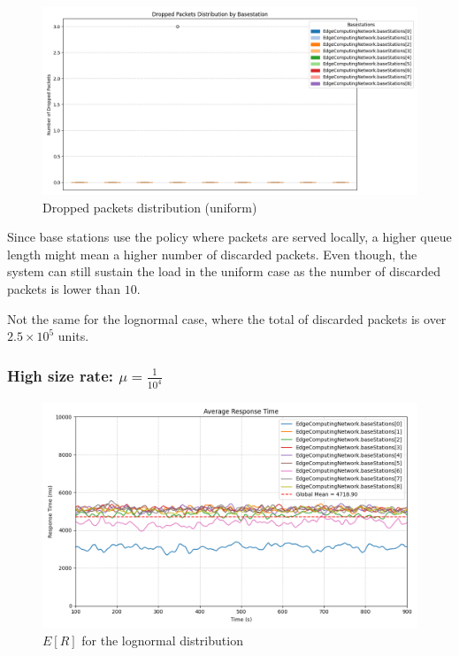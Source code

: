 \documentclass{report}
\begin{document}
\begin{figure}[H]
    \centering
    \includegraphics[width=\textwidth]{img/plots/uni_1e3_A/dropped.png}
    \caption{Dropped packets distribution (uniform)}
\end{figure}

\begin{flushleft}
Since base stations use the policy where packets are served locally, a higher queue length might mean a higher number of discarded packets. Even though, the system can still sustain the load in the uniform case as the number of discarded packets is lower than $10$.

\vspace{1em} 

Not the same for the lognormal case, where the total of discarded packets is over $2.5\times10^5$ units.
\end{flushleft}

\vspace{10mm}

\subsubsection*{High size rate: $\mu=\frac{1}{10^4}$}

\begin{figure}[H]
    \centering
    \includegraphics[width=\textwidth]{img/plots/log_1e4_A/resptime.png}
    \caption{$E[R]$ for the lognormal distribution}
\end{figure}
\end{document}
